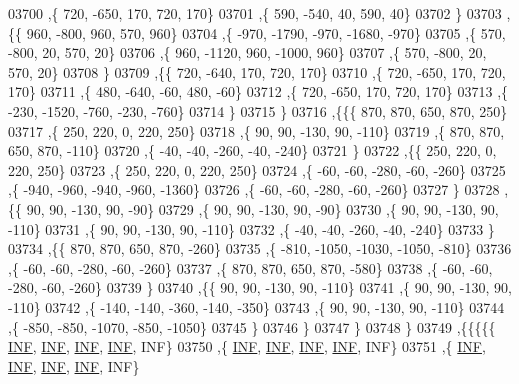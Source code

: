 \begin{DoxyCode}
03700     ,\{   720,  -650,   170,   720,   170\}
03701     ,\{   590,  -540,    40,   590,    40\}
03702     \}
03703    ,\{\{   960,  -800,   960,   570,   960\}
03704     ,\{  -970, -1790,  -970, -1680,  -970\}
03705     ,\{   570,  -800,    20,   570,    20\}
03706     ,\{   960, -1120,   960, -1000,   960\}
03707     ,\{   570,  -800,    20,   570,    20\}
03708     \}
03709    ,\{\{   720,  -640,   170,   720,   170\}
03710     ,\{   720,  -650,   170,   720,   170\}
03711     ,\{   480,  -640,   -60,   480,   -60\}
03712     ,\{   720,  -650,   170,   720,   170\}
03713     ,\{  -230, -1520,  -760,  -230,  -760\}
03714     \}
03715    \}
03716   ,\{\{\{   870,   870,   650,   870,   250\}
03717     ,\{   250,   220,     0,   220,   250\}
03718     ,\{    90,    90,  -130,    90,  -110\}
03719     ,\{   870,   870,   650,   870,  -110\}
03720     ,\{   -40,   -40,  -260,   -40,  -240\}
03721     \}
03722    ,\{\{   250,   220,     0,   220,   250\}
03723     ,\{   250,   220,     0,   220,   250\}
03724     ,\{   -60,   -60,  -280,   -60,  -260\}
03725     ,\{  -940,  -960,  -940,  -960, -1360\}
03726     ,\{   -60,   -60,  -280,   -60,  -260\}
03727     \}
03728    ,\{\{    90,    90,  -130,    90,   -90\}
03729     ,\{    90,    90,  -130,    90,   -90\}
03730     ,\{    90,    90,  -130,    90,  -110\}
03731     ,\{    90,    90,  -130,    90,  -110\}
03732     ,\{   -40,   -40,  -260,   -40,  -240\}
03733     \}
03734    ,\{\{   870,   870,   650,   870,  -260\}
03735     ,\{  -810, -1050, -1030, -1050,  -810\}
03736     ,\{   -60,   -60,  -280,   -60,  -260\}
03737     ,\{   870,   870,   650,   870,  -580\}
03738     ,\{   -60,   -60,  -280,   -60,  -260\}
03739     \}
03740    ,\{\{    90,    90,  -130,    90,  -110\}
03741     ,\{    90,    90,  -130,    90,  -110\}
03742     ,\{  -140,  -140,  -360,  -140,  -350\}
03743     ,\{    90,    90,  -130,    90,  -110\}
03744     ,\{  -850,  -850, -1070,  -850, -1050\}
03745     \}
03746    \}
03747   \}
03748  \}
03749 ,\{\{\{\{\{   \hyperlink{constants_8h_a12c2040f25d8e3a7b9e1c2024c618cb6}{INF},   \hyperlink{constants_8h_a12c2040f25d8e3a7b9e1c2024c618cb6}{INF},   \hyperlink{constants_8h_a12c2040f25d8e3a7b9e1c2024c618cb6}{INF},   \hyperlink{constants_8h_a12c2040f25d8e3a7b9e1c2024c618cb6}{INF},   INF\}
03750     ,\{   \hyperlink{constants_8h_a12c2040f25d8e3a7b9e1c2024c618cb6}{INF},   \hyperlink{constants_8h_a12c2040f25d8e3a7b9e1c2024c618cb6}{INF},   \hyperlink{constants_8h_a12c2040f25d8e3a7b9e1c2024c618cb6}{INF},   \hyperlink{constants_8h_a12c2040f25d8e3a7b9e1c2024c618cb6}{INF},   INF\}
03751     ,\{   \hyperlink{constants_8h_a12c2040f25d8e3a7b9e1c2024c618cb6}{INF},   \hyperlink{constants_8h_a12c2040f25d8e3a7b9e1c2024c618cb6}{INF},   \hyperlink{constants_8h_a12c2040f25d8e3a7b9e1c2024c618cb6}{INF},   \hyperlink{constants_8h_a12c2040f25d8e3a7b9e1c2024c618cb6}{INF},   INF\}

\end{DoxyCode}
